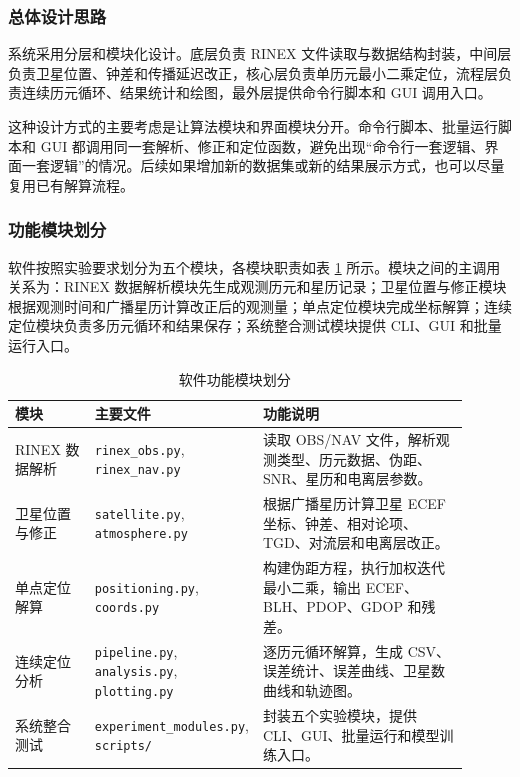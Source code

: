 \subsubsection{总体设计思路}

系统采用分层和模块化设计。底层负责 RINEX 文件读取与数据结构封装，中间层负责卫星位置、钟差和传播延迟改正，核心层负责单历元最小二乘定位，流程层负责连续历元循环、结果统计和绘图，最外层提供命令行脚本和 GUI 调用入口。

这种设计方式的主要考虑是让算法模块和界面模块分开。命令行脚本、批量运行脚本和 GUI 都调用同一套解析、修正和定位函数，避免出现“命令行一套逻辑、界面一套逻辑”的情况。后续如果增加新的数据集或新的结果展示方式，也可以尽量复用已有解算流程。

\subsubsection{功能模块划分}

软件按照实验要求划分为五个模块，各模块职责如表 \ref{tab:software-modules} 所示。模块之间的主调用关系为：RINEX 数据解析模块先生成观测历元和星历记录；卫星位置与修正模块根据观测时间和广播星历计算改正后的观测量；单点定位模块完成坐标解算；连续定位模块负责多历元循环和结果保存；系统整合测试模块提供 CLI、GUI 和批量运行入口。

\begin{table}[H]
\centering
\small
\begin{tabular}{p{0.18\linewidth}p{0.24\linewidth}p{0.48\linewidth}}
\toprule
模块 & 主要文件 & 功能说明 \\
\midrule
RINEX 数据解析 & \texttt{rinex\_obs.py}, \texttt{rinex\_nav.py} & 读取 OBS/NAV 文件，解析观测类型、历元数据、伪距、SNR、星历和电离层参数。 \\
卫星位置与修正 & \texttt{satellite.py}, \texttt{atmosphere.py} & 根据广播星历计算卫星 ECEF 坐标、钟差、相对论项、TGD、对流层和电离层改正。 \\
单点定位解算 & \texttt{positioning.py}, \texttt{coords.py} & 构建伪距方程，执行加权迭代最小二乘，输出 ECEF、BLH、PDOP、GDOP 和残差。 \\
连续定位分析 & \texttt{pipeline.py}, \texttt{analysis.py}, \texttt{plotting.py} & 逐历元循环解算，生成 CSV、误差统计、误差曲线、卫星数曲线和轨迹图。 \\
系统整合测试 & \texttt{experiment\_modules.py}, \texttt{scripts/} & 封装五个实验模块，提供 CLI、GUI、批量运行和模型训练入口。 \\
\bottomrule
\end{tabular}
\caption{软件功能模块划分}
\label{tab:software-modules}
\end{table}

